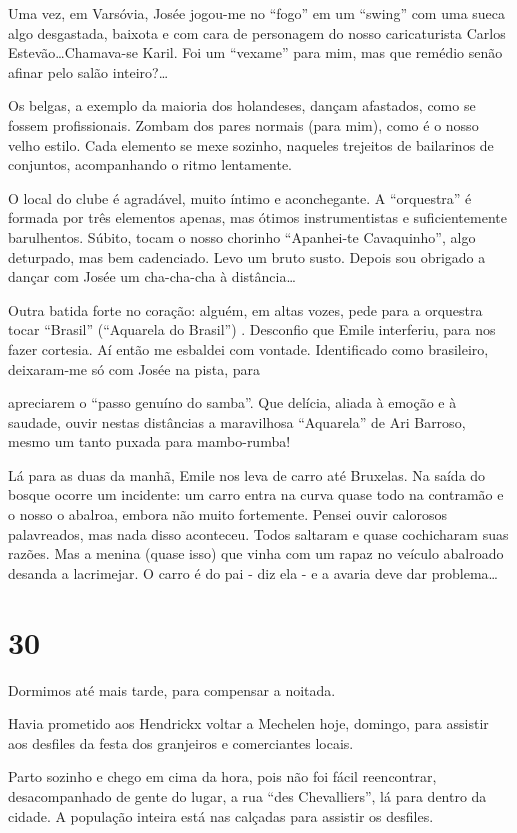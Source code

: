 Uma vez, em Varsóvia, Josée jogou-me no “fogo” em um “swing” com uma sueca algo desgastada, baixota e com cara de personagem do nosso caricaturista Carlos Estevão\ldots Chamava-se Karil. Foi um “vexame” para mim, mas que remédio senão afinar pelo salão inteiro?\ldots

Os belgas, a exemplo da maioria dos holandeses, dançam afastados, como se fossem profissionais. Zombam dos pares normais (para mim), como é o nosso velho estilo. Cada elemento se mexe sozinho, naqueles trejeitos de bailarinos de conjuntos, acompanhando o ritmo lentamente.

O local do clube é agradável, muito íntimo e aconchegante. A “orquestra” é formada por três elementos apenas, mas ótimos instrumentistas e suficientemente barulhentos. Súbito, tocam o nosso chorinho “Apanhei-te Cavaquinho”, algo deturpado, mas bem cadenciado. Levo um bruto susto. Depois sou obrigado a dançar com Josée um cha-cha-cha à distância\ldots

Outra batida forte no coração: alguém, em altas vozes, pede para a orquestra tocar “Brasil” (“Aquarela do Brasil”) . Desconfio que Emile interferiu, para nos fazer cortesia. Aí então me esbaldei com vontade. Identificado como brasileiro, deixaram-me só com Josée na pista, para

apreciarem o “passo genuíno do samba”. Que delícia, aliada à emoção e à saudade, ouvir nestas distâncias a maravilhosa “Aquarela” de Ari Barroso, mesmo um tanto puxada para mambo-rumba!

Lá para as duas da manhã, Emile nos leva de carro até Bruxelas. Na saída do bosque ocorre um incidente: um carro entra na curva quase todo na contramão e o nosso o abalroa, embora não muito fortemente. Pensei ouvir calorosos palavreados, mas nada disso aconteceu. Todos saltaram e quase cochicharam suas razões. Mas a menina (quase isso) que vinha com um rapaz no veículo abalroado desanda a lacrimejar. O carro é do pai - diz ela - e a avaria deve dar problema\ldots

\section*{30 \adfflatleafright {}}
Dormimos até mais tarde, para compensar a noitada.

Havia prometido aos Hendrickx voltar a Mechelen hoje, domingo, para assistir aos desfiles da festa dos granjeiros e comerciantes locais.

Parto sozinho e chego em cima da hora, pois não foi fácil reencontrar, desacompanhado de gente do lugar, a rua “des Chevalliers”, lá para dentro da cidade. A população inteira está nas calçadas para assistir os desfiles.

